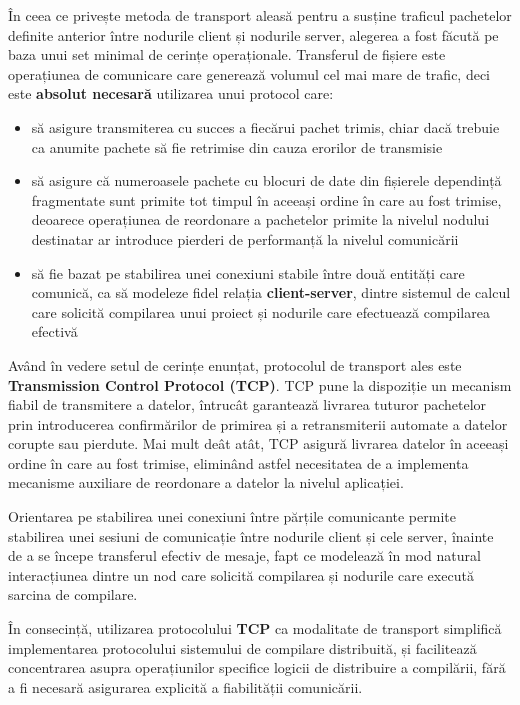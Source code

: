 \newpage

În ceea ce privește metoda de transport aleasă pentru a susține traficul pachetelor definite anterior între nodurile
client și nodurile server, alegerea a fost făcută pe baza unui set minimal de cerințe operaționale. Transferul de 
fișiere este operațiunea de comunicare care generează volumul cel mai mare de trafic, deci este 
\textbf{absolut necesară} utilizarea unui protocol care:

\begin{itemize}
    \item să asigure transmiterea cu succes a fiecărui pachet trimis, chiar dacă trebuie ca anumite pachete să fie
    retrimise din cauza erorilor de transmisie
    \item să asigure că numeroasele pachete cu blocuri de date din fișierele dependință fragmentate sunt primite
    tot timpul în aceeași ordine în care au fost trimise, deoarece operațiunea de reordonare a pachetelor primite
    la nivelul nodului destinatar ar introduce pierderi de performanță la nivelul comunicării
    \item să fie bazat pe stabilirea unei conexiuni stabile între două entități care comunică, ca să modeleze fidel relația
    \textbf{client-server}, dintre sistemul de calcul care solicită compilarea unui proiect și nodurile care efectuează
    compilarea efectivă
\end{itemize}

Având în vedere setul de cerințe enunțat, protocolul de transport ales este \textbf{Transmission Control Protocol (TCP)}\cite{cerf1974protocol}.
TCP pune la dispoziție un mecanism fiabil de transmitere a datelor, întrucât garantează livrarea tuturor pachetelor prin
introducerea confirmărilor de primirea și a retransmiterii automate a datelor corupte sau pierdute. Mai mult deât atât, TCP
asigură livrarea datelor în aceeași ordine în care au fost trimise, eliminând astfel necesitatea de a implementa mecanisme
auxiliare de reordonare a datelor la nivelul aplicației.

Orientarea pe stabilirea unei conexiuni între părțile comunicante permite stabilirea unei sesiuni de comunicație între nodurile
client și cele server, înainte de a se începe transferul efectiv de mesaje, fapt ce modelează în mod natural interacțiunea
dintre un nod care solicită compilarea și nodurile care execută sarcina de compilare.

În consecință, utilizarea protocolului \textbf{TCP} ca modalitate de transport simplifică implementarea protocolului 
sistemului de compilare distribuită, și facilitează concentrarea asupra operațiunilor specifice
logicii de distribuire a compilării, fără a fi necesară asigurarea explicită a fiabilității comunicării.


